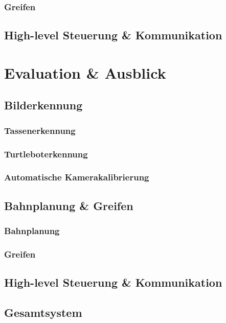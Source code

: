 \documentclass[de,ids]{fziartcl}
\begin{document}
\subsubsection{Greifen}
\subsection{High-level Steuerung \& Kommunikation}

\section{Evaluation \& Ausblick} %
\subsection{Bilderkennung}
\subsubsection{Tassenerkennung}
\subsubsection{Turtleboterkennung}
\subsubsection{Automatische Kamerakalibrierung}
\subsection{Bahnplanung \& Greifen}
\subsubsection{Bahnplanung}
\subsubsection{Greifen}
\subsection{High-level Steuerung \& Kommunikation}
\subsection{Gesamtsystem}


\end{document}
